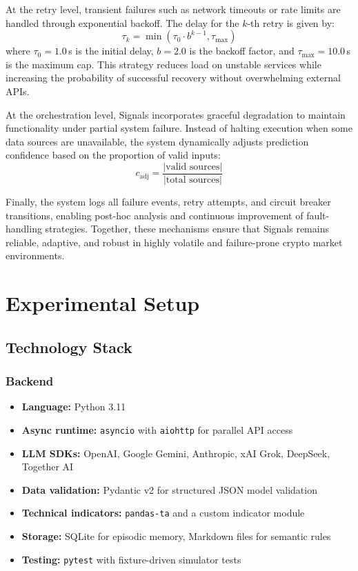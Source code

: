 \documentclass[12pt,a4paper,oneside,openany]{book}
\begin{document}
At the retry level, transient failures such as network timeouts or rate limits are handled through exponential backoff. The delay for the $k$-th retry is given by:
\begin{equation}
\tau_k = \min(\tau_0 \cdot b^{k-1}, \tau_{\max})
\end{equation}
where $\tau_0 = 1.0$\,s is the initial delay, $b = 2.0$ is the backoff factor, and $\tau_{\max} = 10.0$\,s is the maximum cap. This strategy reduces load on unstable services while increasing the probability of successful recovery without overwhelming external APIs.

At the orchestration level, Signals incorporates graceful degradation to maintain functionality under partial system failure. Instead of halting execution when some data sources are unavailable, the system dynamically adjusts prediction confidence based on the proportion of valid inputs:
\begin{equation}
c_{\mathrm{adj}} = \frac{|\text{valid sources}|}{|\text{total sources}|}
\end{equation}


Finally, the system logs all failure events, retry attempts, and circuit breaker transitions, enabling post-hoc analysis and continuous improvement of fault-handling strategies. Together, these mechanisms ensure that Signals remains reliable, adaptive, and robust in highly volatile and failure-prone crypto market environments.

\chapter{Experimental Setup}
\label{ch:setup}

\section{Technology Stack}

\subsection{Backend}
\begin{itemize}[leftmargin=8mm]
\item \textbf{Language:} Python 3.11
\item \textbf{Async runtime:} \texttt{asyncio} with \texttt{aiohttp} for parallel API access
\item \textbf{LLM SDKs:} OpenAI, Google Gemini, Anthropic, xAI Grok, DeepSeek, Together AI
\item \textbf{Data validation:} Pydantic v2 for structured JSON model validation
\item \textbf{Technical indicators:} \texttt{pandas-ta} and a custom indicator module
\item \textbf{Storage:} SQLite for episodic memory, Markdown files for semantic rules
\item \textbf{Testing:} \texttt{pytest} with fixture-driven simulator tests
\end{itemize}
\end{document}
